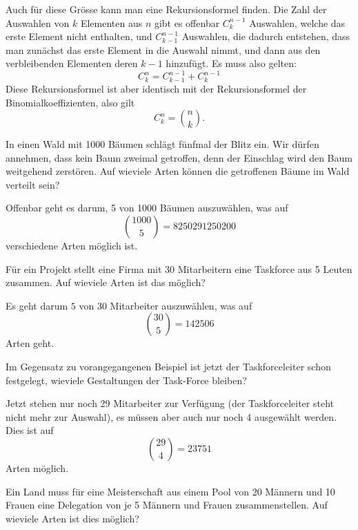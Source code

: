 Auch für diese Grösse kann man eine Rekursionsformel finden.
Die Zahl der Auswahlen von $k$ Elementen aus $n$ gibt es
offenbar $C^{n-1}_{k}$ Auswahlen, welche das erste Element nicht
enthalten, und $C^{n-1}_{k-1}$ Auswahlen, die dadurch entstehen,
dass man zunächst das erste Element in die Auswahl nimmt, und dann
aus den verbleibenden Elementen deren $k-1$ hinzufügt.
Es muss also
gelten:
\[
C^n_k=C^{n-1}_{k-1}+C^{n-1}_{k}
\]
Diese Rekursionsformel ist aber identisch mit der Rekursionsformel
der Binomialkoeffizienten, also gilt
\[
C^n_k=\binom{n}{k}.
\]

\begin{beispiele}
\item In einen Wald mit 1000 Bäumen schlägt fünfmal der Blitz ein.
Wir dürfen annehmen, dass kein Baum zweimal getroffen, denn der
Einschlag wird den Baum weitgehend zerstören.
Auf wieviele Arten
können die getroffenen Bäume im Wald verteilt sein?

\begin{loesung}
Offenbar geht es darum, 5 von 1000 Bäumen auszuwählen, was 
auf
\[
\binom{1000}{5}=8250291250200
\]
verschiedene Arten möglich ist.
\end{loesung}

\item Für ein Projekt stellt eine Firma mit 30 Mitarbeitern eine Taskforce
aus 5 Leuten zusammen.
Auf wieviele Arten ist das möglich?


\begin{loesung}
Es geht darum $5$ von $30$ Mitarbeiter auszuwählen, was auf
\[
\binom{30}{5}=142506
\]
Arten geht.
\end{loesung}

\item Im Gegensatz zu vorangegangenen Beispiel ist jetzt der
Taskforceleiter schon festgelegt, wieviele Gestaltungen der
Task-Force bleiben?

\begin{loesung}
Jetzt stehen nur noch 29 Mitarbeiter zur Verfügung (der Taskforceleiter
steht nicht mehr zur Auswahl), es müssen aber auch nur noch 4 ausgewählt
werden.
Dies ist auf
\[
\binom{29}{4}=23751
\]
Arten möglich.
\end{loesung}

\item\label{meisterschaft}
Ein Land muss für eine Meisterschaft aus einem Pool von
20 Männern und 10 Frauen eine Delegation von je 5 Männern
und Frauen zusammenstellen.
Auf wieviele Arten ist dies möglich?


\end{beispiele}

